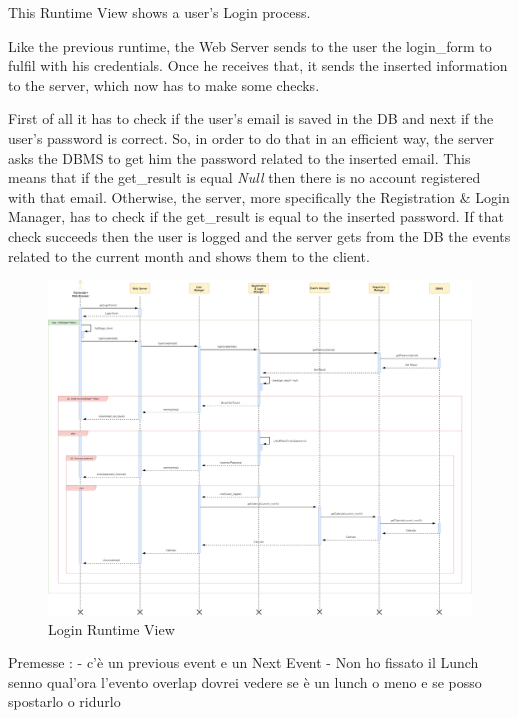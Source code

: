 This Runtime View shows a user's Login process.\par
Like the previous runtime, the Web Server sends to the user the login\_form to fulfil with his credentials. Once he receives that, it sends the inserted information to the server, which now has to make some checks.\par
First of all it has to check if the user’s email is saved in the DB and next if the user’s password is correct. So, in order to do that in an efficient way, the server asks the DBMS to get him the password related to the inserted email. This means that if the get\_result is equal \emph{Null} then there is no account registered with that email. Otherwise, the server, more specifically the Registration \& Login Manager, has to check if the get\_result is equal to the inserted password.
If that check succeeds then the user is logged and the server gets from the DB the events related to the current month and shows them to the client.
\begin{figure}[H]
	\centering
	\includegraphics[scale=0.17]{Images/Runtime/Login}
	\caption{Login Runtime View}
\end{figure}

Premesse :
- c'è un previous event e un Next Event
- Non ho fissato il Lunch senno qual'ora l'evento overlap dovrei vedere se è un lunch o meno e se posso spostarlo o ridurlo

